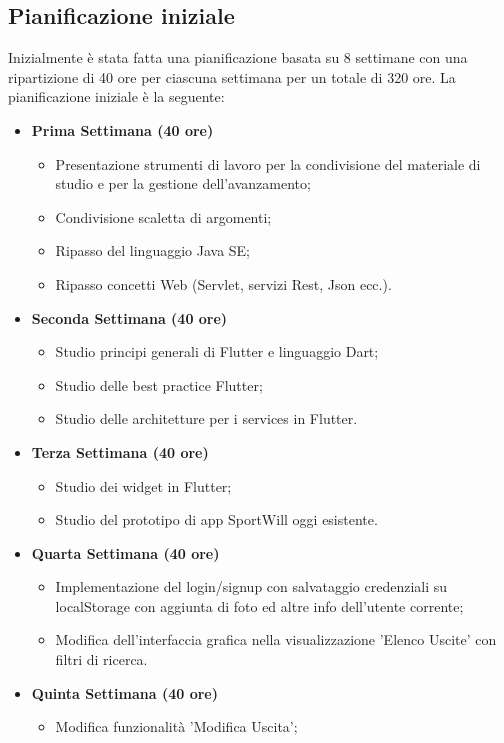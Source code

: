\subsection{Pianificazione iniziale}
Inizialmente è stata fatta una pianificazione basata su 8 settimane con una ripartizione di 40 ore per ciascuna settimana per un totale di 320 ore.
La pianificazione iniziale è la seguente:
 \begin{itemize}
	\item \textbf{Prima Settimana (40 ore)}
	\begin{itemize}
		\item Presentazione strumenti di lavoro per la condivisione del materiale di studio e per la gestione
		dell’avanzamento;
		\item Condivisione scaletta di argomenti;
		\item Ripasso del linguaggio Java SE;
		\item Ripasso concetti Web (Servlet, servizi Rest, Json ecc.).
	\end{itemize}
	\item \textbf{Seconda Settimana (40 ore)} 
	\begin{itemize}
		\item Studio principi generali di Flutter e linguaggio Dart;
		\item Studio delle best practice Flutter;
		\item Studio delle architetture per i services in Flutter.
	\end{itemize}
	\item \textbf{Terza Settimana (40 ore)} 
	\begin{itemize}
		\item Studio dei widget in Flutter;
		\item Studio del prototipo di app SportWill oggi esistente.
	\end{itemize}
	\item \textbf{Quarta Settimana (40 ore)} 
	\begin{itemize}
		\item Implementazione del login/signup con salvataggio credenziali su localStorage con aggiunta di foto ed altre info dell'utente corrente;
		\item Modifica dell'interfaccia grafica nella visualizzazione 'Elenco Uscite' con filtri di ricerca.
	\end{itemize}
	\item \textbf{Quinta Settimana (40 ore)} 
	\begin{itemize}
		\item Modifica funzionalità 'Modifica Uscita';

\end{itemize}
\end{itemize}
